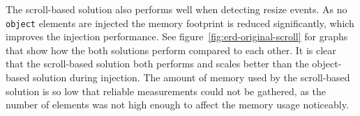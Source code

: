 \documentclass[a4paper,11pt]{kth-mag}
\newcommand{\code}[1]{\texttt{#1}}
\begin{document}

        The scroll-based solution also performs well when detecting resize events.
        As no \code{object} \glspl{element} are injected the memory footprint is reduced significantly, which improves the injection performance.
        See figure~\ref{fig:erd-original-scroll} for graphs that show how the both solutions perform compared to each other.
        It is clear that the scroll-based solution both performs and scales better than the object-based solution during injection.        
        The amount of memory used by the scroll-based solution is so low that reliable measurements could not be gathered, as the number of \glspl{element} was not high enough to affect the memory usage noticeably.
\end{document}
